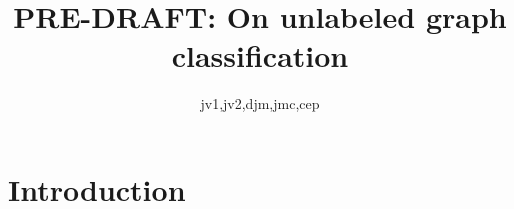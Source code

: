  
\usepackage{url}

\newcommand{\mcE}{\mathcal{E}}
\newcommand{\mcT}{\mathcal{T}}
\newcommand{\mcG}{\mathcal{G}}
\newcommand{\mcM}{\mathcal{M}}
\newcommand{\mcL}{\mathcal{L}}
\newcommand{\hatmcE}{\widehat{\mcE}}
\newcommand{\hatp}{\widehat{p}}
\newcommand{\hatP}{\widehat{P}}
\newcommand{\hatQ}{\widehat{Q}}
\newcommand{\hatL}{\widehat{L}}
\newcommand{\mhP}{\widehat{\PP}}
\newcommand{\tildeA}{\widetilde{A}}
\newcommand{\GG}{\mathbb{G}}

\newcommand{\defa}{\begin{defi}}
\newcommand{\defb}{\end{defi}}

\newtheorem{Rem}{Remark}%
\newtheorem{Alg}{Algorithm}%
\newtheorem{Thm}{Theorem}[section]
\newtheorem{Lem}{Lemma}[section]
\newtheorem{Def}{Definition}[section]

\title{PRE-DRAFT: On unlabeled graph classification}

\author{jv1,jv2,djm,jmc,cep}



\maketitle


\section{Introduction}

